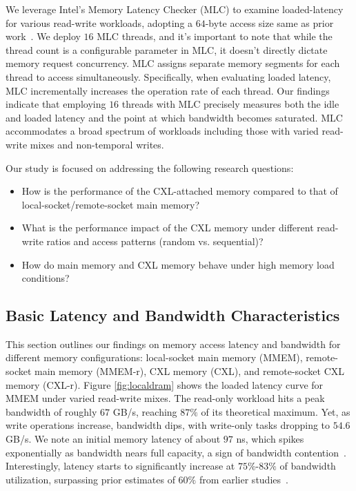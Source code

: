  We leverage Intel's Memory Latency Checker (MLC) to examine loaded-latency for various read-write workloads, adopting a $64$-byte access size same as prior work~\cite{demystify}. We deploy $16$ MLC threads, and it's important to note that while the thread count is a configurable parameter in MLC, it doesn't directly dictate memory request concurrency. MLC assigns separate memory segments for each thread to access simultaneously. Specifically, when evaluating loaded latency, MLC incrementally increases the operation rate of each thread. Our findings indicate that employing $16$ threads with MLC precisely measures both the idle and loaded latency and the point at which bandwidth becomes saturated. MLC accommodates a broad spectrum of workloads including those with varied read-write mixes and non-temporal writes.

Our study is focused on addressing the following research questions:

\begin{itemize}
    \item How is the performance of the CXL-attached memory compared to that of local-socket/remote-socket main memory?
    \item What is the performance impact of the CXL memory under different read-write ratios and access patterns (random vs. sequential)?
    \item How do main memory and CXL memory behave under high memory load conditions?
\end{itemize}


\subsection{Basic Latency and Bandwidth Characteristics}
\label{ssec:performance}
This section outlines our findings on memory access latency and bandwidth for different memory configurations: local-socket main memory (MMEM), remote-socket main memory (MMEM-r), CXL memory (CXL), and remote-socket CXL memory (CXL-r). Figure \ref{fig:localdram} shows the loaded latency curve for MMEM under varied read-write mixes. The read-only workload hits a peak bandwidth of roughly $67$ GB/s, reaching $87\%$ of its theoretical maximum. Yet, as write operations increase, bandwidth dips, with write-only tasks dropping to $54.6$ GB/s. We note an initial memory latency of about $97$ ns, which spikes exponentially as bandwidth nears full capacity, a sign of bandwidth contention~\cite{cxl-centric, mt2}. Interestingly, latency starts to significantly increase at $75\%$-$83\%$ of bandwidth utilization, surpassing prior estimates of $60\%$ from earlier studies~\cite{cxl-centric}.


